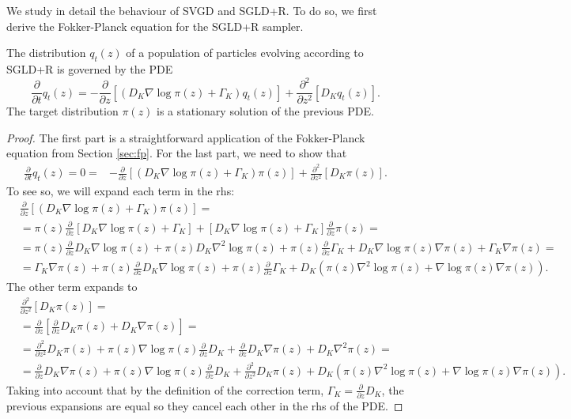 We study in detail the behaviour of SVGD and SGLD+R. To do so, we first derive the Fokker-Planck equation for the SGLD+R sampler.
\begin{proposition}
The distribution $q_t({z})$ of a population of particles evolving according to SGLD+R is governed by the PDE
$$
\frac{\partial}{\partial t} q_t({z}) = -\frac{\partial}{\partial {z}} \left[ (D_K \nabla \log \pi({z}) + \Gamma_K) q_t({z})\right] + \frac{\partial^2}{\partial {z}^2} \left[ D_K q_t({z})  \right].
$$
The target distribution $\pi({z})$ is a stationary solution of the previous PDE.
\end{proposition}
\begin{proof}
The first part is a straightforward application of the Fokker-Planck equation from Section \ref{sec:fp}. For the last part, we need to show that
\begin{align*}
\frac{\partial}{\partial t} q_t({z}) = 0 = &-\frac{\partial}{\partial {z}} \left[ ({D_K} \nabla \log \pi({z}) + {\Gamma_K}) \pi({z})\right] +  \frac{\partial^2}{\partial {z}^2} \left[ {D_K} \pi({z})  \right].
\end{align*}
To see so, we will expand each term in the rhs:
\begin{align*}
& \frac{\partial}{\partial {z}} \left[ ({D_K} \nabla \log \pi({z}) + {\Gamma_K}) \pi({z})\right] = \\
&= \pi({z})\frac{\partial}{\partial {z}} \left[ {D_K} \nabla \log \pi({z}) + {\Gamma_K} \right] +  \left[ {D_K} \nabla \log \pi({z}) + {\Gamma_K} \right] \frac{\partial}{\partial {z}} \pi({z}) = \\
&= \pi({z})\frac{\partial}{\partial {z}}{D_K} \nabla \log \pi({z})+ \pi({z}){D_K} \nabla^2 \log \pi({z}) + \pi({z}) \frac{\partial}{\partial {z}} {\Gamma_K} + {D_K} \nabla \log \pi({z}) \nabla \pi({z})  + {\Gamma_K} \nabla \pi({z}) = \\
&= {\Gamma_K} \nabla \pi({z}) + \pi({z})\frac{\partial}{\partial {z}}{D_K}\nabla \log \pi({z}) +  
\pi({z}) \frac{\partial}{\partial {z}} {\Gamma_K} +
{D_K}(\pi({z})\nabla^2 \log \pi({z}) + \nabla \log \pi({z}) \nabla \pi({z})).
\end{align*}
The other term expands to
\begin{align*}
&\frac{\partial^2}{\partial {z}^2} \left[ {D_K} \pi({z})  \right] = \\
&= \frac{\partial}{\partial {z}} \left[ \frac{\partial}{\partial {z}} {D_K} \pi({z}) + {D_K} \nabla \pi({z}) \right] = \\
&= \frac{\partial^2}{\partial {z}^2}{D_K} \pi({z}) + \pi({z}) \nabla \log \pi({z}) \frac{\partial}{\partial {z}}{D_K} + \frac{\partial}{\partial {z}}  {D_K} \nabla \pi({z}) + {D_K} \nabla^2 \pi({z}) = \\
&= \frac{\partial}{\partial {z}}  {D_K} \nabla \pi({z}) +
\pi({z}) \nabla \log \pi({z}) \frac{\partial}{\partial {z}}{D_K} + \frac{\partial^2}{\partial {z}^2}{D_K} \pi({z})+ 
{D_K}(\pi({z})\nabla^2 \log \pi({z}) + \nabla \log \pi({z}) \nabla \pi({z})).
\end{align*}
Taking into account that by the definition of the correction term, $\Gamma_K = \frac{\partial}{\partial {z}} D_K$, the previous expansions are equal so they cancel each other in the rhs of the PDE.
\end{proof}
